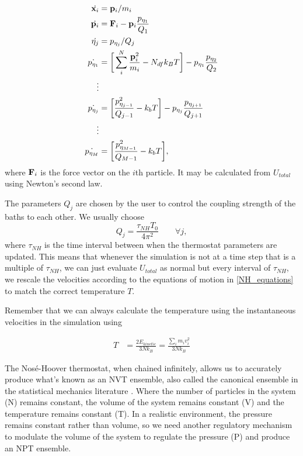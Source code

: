 \begin{equation}
	\begin{aligned}
		\dot{\bold{x}_i} &= \bold{p}_i/m_i \\
		\dot{\bold{p}_i} &= \bold{F}_i-\bold{p}_i\frac{p_{\eta_1}}{Q_1} \\
		\dot{\eta_j} &= p_{\eta_j}/Q_j \\
		\dot{p_{\eta_1}} &= \bigg[\sum_i^N \frac{\bold{p}_i^2}{m_i} - N_{df} k_B T\bigg]  - p_{\eta_1}\frac{p_{\eta_2}}{Q_2} \\ 
		\vdots \\ 
		\dot{p_{\eta_j}} &= \bigg[ \frac{p^2_{\eta_{j-1}}}{Q_{j-1}} - k_bT \bigg]  - p_{\eta_{j}}\frac{p_{\eta_{j+1}}}{Q_{j+1}} \\ 
		\vdots \\ 
		\dot{p_{\eta_M}} &= \bigg[ \frac{p^2_{\eta_{M-1}}}{Q_{M-1}} - k_bT \bigg],
	\end{aligned}
	\label{NH_equations}
\end{equation}
where $\bold{F}_i$ is the force vector on the $i$th particle. It may be calculated from $U_{total}$ using Newton's second law. 

The parameters $Q_j$ are chosen by the user to control the coupling strength of the baths to each other. We usually choose   
\begin{equation}
	Q_j = \frac{\tau_{NH}T_0}{4\pi^2}\qquad  \forall j,
\end{equation}
where $\tau_{NH}$ is the time interval between when the thermostat parameters are updated. This means that whenever the simulation is not at a time step that is a multiple of $\tau_{NH}$,  we can just evaluate $U_{total}$ as normal but every interval of $\tau_{NH}$, we rescale the velocities according to the equations of motion in \ref{NH_equations} to match the correct temperature $T$.

Remember that we can always calculate the temperature using the instantaneous velocities in the simulation using

\begin{equation}
	\begin{aligned}
		T &= \frac{2E_{kinetic}}{3Nk_B}  =  \frac{\sum_i m_i v_i^2}{3Nk_B} 
	\end{aligned}
\end{equation}
	
The Nos\'e-Hoover thermostat, when chained infinitely, allows us to  accurately produce what's known as an NVT ensemble, also called the canonical ensemble in the statistical mechanics literature \cite{martyna1992}. Where the number of particles in the system (N) remains constant, the volume of the system remains constant (V) and the temperature remains constant (T). In a realistic environment, the pressure remains constant rather than volume, so we need another regulatory mechanism to modulate the volume of the system to regulate the pressure (P) and produce an NPT ensemble. 

